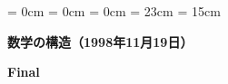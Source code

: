 
\topmargin = 0cm
\oddsidemargin = 0cm \evensidemargin = 0cm
\textheight = 23cm \textwidth = 15cm %

\newcommand{\bZ}{\mbox{\boldmath $Z$}}
\newcommand{\bQ}{\mbox{\boldmath $Q$}}
\newcommand{\bR}{\mbox{\boldmath $R$}}
\newcommand{\bC}{\mbox{\boldmath $C$}}
\newcommand{\bN}{\mbox{\boldmath $N$}}
\newcommand{\batsu}{{\large $\times$}}
\newcommand{\maru}{$\bigcirc$}

\pagestyle{empty}
\def\labelenumii{(\theenumii)}
\def\labelenumiii{(\theenumiii)}
\def\theenumi{\Roman{enumi}}
\def\theenumii{\arabic{enumii}}
\def\theenumiii{\alph{enumiii}}


{\bf 数学の構造（1998年11月19日）}

\smallskip
{\Huge\bf Final}

